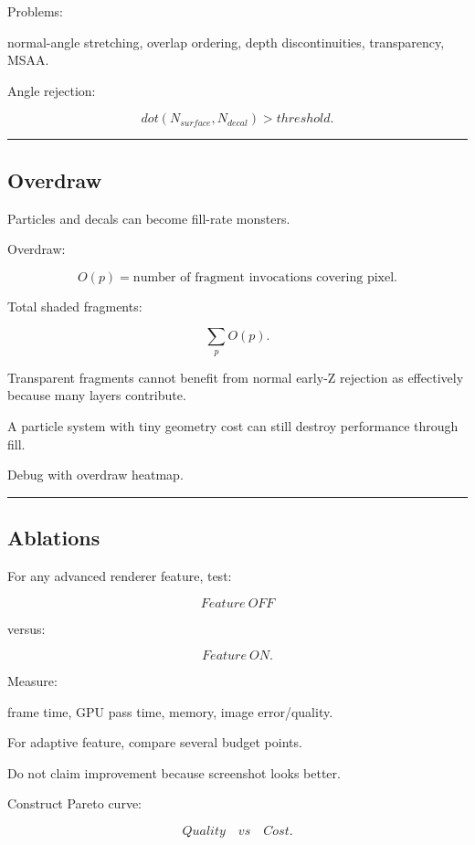 Problems:

normal-angle stretching, overlap ordering, depth discontinuities, transparency, MSAA.

Angle rejection:

\[
dot(N_{surface},N_{decal})
>
threshold.
\]

\begin{center}\rule{0.5\linewidth}{0.5pt}\end{center}

\subsection{Overdraw}\label{04-visual-computing-ii-ch040-overdraw}

Particles and decals can become fill-rate monsters.

Overdraw:

\[
O(p)
=
\text{number of fragment invocations covering pixel}.
\]

Total shaded fragments:

\[
\sum_pO(p).
\]

Transparent fragments cannot benefit from normal early-Z rejection as effectively because many layers contribute.

A particle system with tiny geometry cost can still destroy performance through fill.

Debug with overdraw heatmap.

\begin{center}\rule{0.5\linewidth}{0.5pt}\end{center}

\subsection{Ablations}\label{04-visual-computing-ii-ch040-ablations}

For any advanced renderer feature, test:

\[
Feature\ OFF
\]

versus:

\[
Feature\ ON.
\]

Measure:

frame time, GPU pass time, memory, image error/quality.

For adaptive feature, compare several budget points.

Do not claim improvement because screenshot looks better.

Construct Pareto curve:

\[
\boxed{
Quality
\quad vs\quad
Cost.
}
\]

